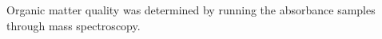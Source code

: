 Organic matter quality was determined by running the absorbance samples through mass spectroscopy.  
    